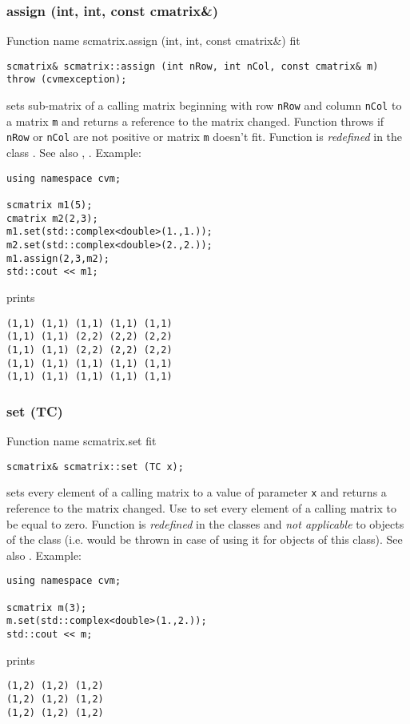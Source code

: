 \subsubsection{assign (int, int, const cmatrix\&)}
Function%
\pdfdest name {scmatrix.assign (int, int, const cmatrix&)} fit
\begin{verbatim}
scmatrix& scmatrix::assign (int nRow, int nCol, const cmatrix& m)
throw (cvmexception);
\end{verbatim}
sets sub-matrix of a calling matrix beginning with \Based row
\verb"nRow" and column \verb"nCol" to a matrix \verb"m" and
returns a reference to the matrix changed. Function throws 
  if \verb"nRow"
or \verb"nCol" are not positive or matrix \verb"m" doesn't fit.
Function is \emph{redefined} in the class
.
See also , .
Example:
\begin{Verbatim}
using namespace cvm;

scmatrix m1(5);
cmatrix m2(2,3);
m1.set(std::complex<double>(1.,1.));
m2.set(std::complex<double>(2.,2.));
m1.assign(2,3,m2);
std::cout << m1;
\end{Verbatim}
prints
\begin{Verbatim}
(1,1) (1,1) (1,1) (1,1) (1,1)
(1,1) (1,1) (2,2) (2,2) (2,2)
(1,1) (1,1) (2,2) (2,2) (2,2)
(1,1) (1,1) (1,1) (1,1) (1,1)
(1,1) (1,1) (1,1) (1,1) (1,1)
\end{Verbatim}
\newpage



\subsubsection{set (TC)}
Function%
\pdfdest name {scmatrix.set} fit
\begin{verbatim}
scmatrix& scmatrix::set (TC x);
\end{verbatim}
sets every element of a calling matrix to a value of
parameter \verb"x" and returns a reference to
the matrix changed.
Use  to set every element
of a calling matrix to be equal to zero.
Function is \emph{redefined} in the classes
 and
\emph{not applicable} to objects of the class
 (i.e.  would be thrown
in case of using it for objects of this class).
See also .
Example:
\begin{Verbatim}
using namespace cvm;

scmatrix m(3);
m.set(std::complex<double>(1.,2.));
std::cout << m;
\end{Verbatim}
prints
\begin{Verbatim}
(1,2) (1,2) (1,2)
(1,2) (1,2) (1,2)
(1,2) (1,2) (1,2)
\end{Verbatim}
\newpage




